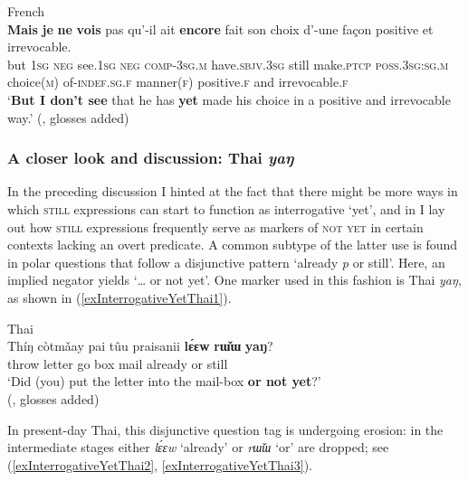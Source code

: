 \begin{exe}
	\ex French\label{exInterrogativeYetFrenchSubordinate}\\
	\gll \textbf{Mais} \textbf{je} \textbf{ne} \textbf{vois} pas qu'-il ait \textbf{encore} fait son choix d’-une façon positive et irrevocable.\\
	but 1\textsc{sg} \textsc{neg} see.1\textsc{sg} \textsc{neg} \textsc{comp}-3\textsc{sg}.\textsc{m} have.\textsc{sbjv}.3\textsc{sg} still make.\textsc{ptcp} \textsc{poss}.3\textsc{sg}:\textsc{sg}.\textsc{m} choice(\textsc{m}) of-\textsc{indef}.\textsc{sg}.\textsc{f} manner(\textsc{f}) positive.\textsc{f} and irrevocable.\textsc{f}\\
	\glt \lq \textbf{But I don’t see} that he has \textbf{yet} made his choice in a positive and irrevocable way.' (\cite[169]{Martin1980}, glosses added)
\end{exe}

\subsubsection{A closer look and discussion: Thai \textit{yaŋ}}
In the preceding discussion I  hinted at the fact that there might be more ways in which \textsc{still} expressions can start to function as interrogative \lq yet\rq{}, and in  I lay out how \textsc{still} expressions frequently serve as markers of \textsc{not yet} in certain contexts lacking an overt predicate. A common subtype of the latter use is found in polar questions that follow a disjunctive pattern \lq already \textit{p} or still\rq{}. Here, an implied negator yields \lq … or not yet'. One marker used in this fashion is Thai \textit{yaŋ}, as shown in (\ref{exInterrogativeYetThai1}).

\begin{exe}
	\ex Thai\label{exInterrogativeYetThai1}\\
	\gll Thíŋ		còtmǎay	pai	tûu	praisanii	\textbf{lɛ́ɛw}		\textbf{rɯ̌ɯ}	\textbf{yaŋ}?\\
	throw letter go box mail already or still\\
	\glt \lq Did (you) put the letter into the mail-box \textbf{or not yet}?'
	\\(\cite[500]{Koelver1991},  glosses added)
\end{exe}

In present-day Thai, this disjunctive question tag is undergoing erosion: in the intermediate stages either \textit{lɛ́ɛw} \lq already' or \textit{rɯ̌ɯ} \lq or' are dropped; see (\ref{exInterrogativeYetThai2}, \ref{exInterrogativeYetThai3}). 

